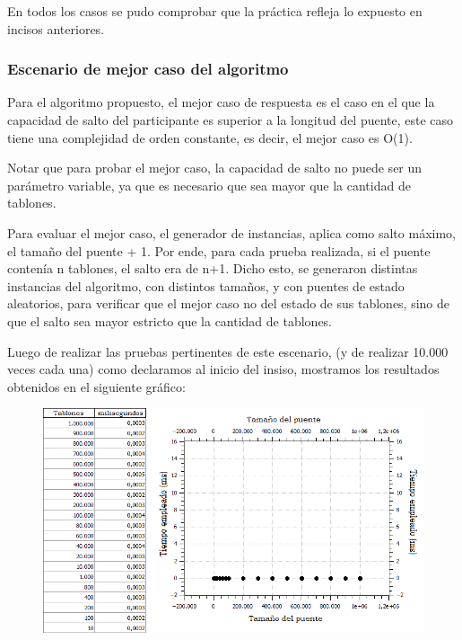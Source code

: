 \documentclass[10pt,a4paper]{article}
\begin{document}
\noindent En todos los casos se pudo comprobar que la práctica refleja lo expuesto en incisos anteriores.

\newpage \subsubsection{Escenario de mejor caso del algoritmo}

\noindent Para el algoritmo propuesto, el mejor caso de respuesta es el caso en el que la capacidad de salto del participante es superior a la longitud del puente, este caso tiene una complejidad de orden constante, es decir, el mejor caso es O(1).

\noindent Notar que para probar el mejor caso, la capacidad de salto no puede ser un parámetro variable, ya que es necesario que sea mayor que la cantidad de tablones.

\noindent Para evaluar el mejor caso, el generador de instancias, aplica como salto máximo, el tamaño del puente + 1. Por ende, para cada prueba realizada, si el puente contenía n tablones, el salto era de n+1.
Dicho esto, se generaron distintas instancias del algoritmo, con distintos tamaños, y con puentes de estado aleatorios, para verificar que el mejor caso no del estado de sus tablones, sino de que el salto sea mayor estricto que la cantidad de tablones.

\noindent Luego de realizar las pruebas pertinentes de este escenario, (y de realizar  10.000 veces cada una) como declaramos al inicio del insiso, mostramos los resultados obtenidos en el siguiente gráfico:

	\begin{figure}[h]
		\begin{center}
		   \includegraphics[scale=0.75]{casosDeTest/GRAFICOS/png/Ej1mejorCasoPNG.png}
		\end{center}
	\end{figure}
\end{document}
